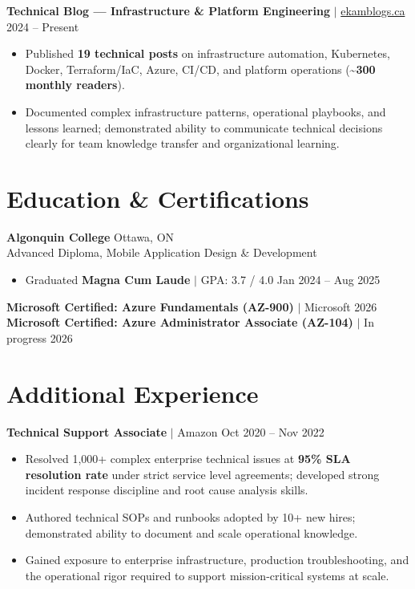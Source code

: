 \documentclass[11pt,a4paper]{article}
\begin{document}
\vspace{4pt}

\textbf{Technical Blog — Infrastructure \& Platform Engineering} $|$ \href{https://www.ekamblogs.ca}{ekamblogs.ca} \hfill 2024 -- Present
\begin{itemize}
    \item Published \textbf{19 technical posts} on infrastructure automation, Kubernetes, Docker, Terraform/IaC, Azure, CI/CD, and platform operations (\textasciitilde\textbf{300 monthly readers}).
    \item Documented complex infrastructure patterns, operational playbooks, and lessons learned; demonstrated ability to communicate technical decisions clearly for team knowledge transfer and organizational learning.
\end{itemize}

\section{Education \& Certifications}

\textbf{Algonquin College} \hfill Ottawa, ON \\
Advanced Diploma, Mobile Application Design \& Development
\begin{itemize}
    \item Graduated \textbf{Magna Cum Laude} $|$ GPA: 3.7 / 4.0 \hfill Jan 2024 -- Aug 2025
\end{itemize}
\textbf{Microsoft Certified: Azure Fundamentals (AZ-900)} $|$ Microsoft \hfill 2026 \\
\textbf{Microsoft Certified: Azure Administrator Associate (AZ-104)} $|$ In progress \hfill 2026

\section{Additional Experience}

\textbf{Technical Support Associate} $|$ Amazon \hfill Oct 2020 -- Nov 2022
\begin{itemize}
    \item Resolved 1,000+ complex enterprise technical issues at \textbf{95\% SLA resolution rate} under strict service level agreements; developed strong incident response discipline and root cause analysis skills.
    \item Authored technical SOPs and runbooks adopted by 10+ new hires; demonstrated ability to document and scale operational knowledge.
    \item Gained exposure to enterprise infrastructure, production troubleshooting, and the operational rigor required to support mission-critical systems at scale.
\end{itemize}
\end{document}
